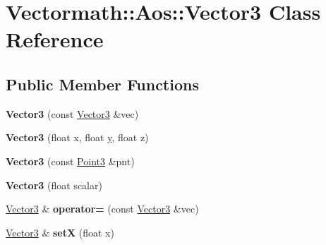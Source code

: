 \hypertarget{class_vectormath_1_1_aos_1_1_vector3}{\section{Vectormath\+:\+:Aos\+:\+:Vector3 Class Reference}
\label{class_vectormath_1_1_aos_1_1_vector3}
}
\subsection*{Public Member Functions}
\begin{DoxyCompactItemize}
\item 
\hypertarget{class_vectormath_1_1_aos_1_1_vector3_ac61c5909c53f4daf35a4950a94de9b1d}{{\bfseries Vector3} (const \hyperlink{class_vectormath_1_1_aos_1_1_vector3}{Vector3} \&vec)}\label{class_vectormath_1_1_aos_1_1_vector3_ac61c5909c53f4daf35a4950a94de9b1d}

\item 
\hypertarget{class_vectormath_1_1_aos_1_1_vector3_a0cded5830f3b42d3983f187fb2716f4f}{{\bfseries Vector3} (float x, float \hyperlink{_ice_utils_8h_aa7ffaed69623192258fb8679569ff9ba}{y}, float z)}\label{class_vectormath_1_1_aos_1_1_vector3_a0cded5830f3b42d3983f187fb2716f4f}

\item 
\hypertarget{class_vectormath_1_1_aos_1_1_vector3_a5c4725284242af1e99b5ab244c03ad2e}{{\bfseries Vector3} (const \hyperlink{class_vectormath_1_1_aos_1_1_point3}{Point3} \&pnt)}\label{class_vectormath_1_1_aos_1_1_vector3_a5c4725284242af1e99b5ab244c03ad2e}

\item 
\hypertarget{class_vectormath_1_1_aos_1_1_vector3_aa64785a6836fa840d949fecd6d419721}{{\bfseries Vector3} (float scalar)}\label{class_vectormath_1_1_aos_1_1_vector3_aa64785a6836fa840d949fecd6d419721}

\item 
\hypertarget{class_vectormath_1_1_aos_1_1_vector3_a01b5bd9dda1570098fed4ac8567710f2}{\hyperlink{class_vectormath_1_1_aos_1_1_vector3}{Vector3} \& {\bfseries operator=} (const \hyperlink{class_vectormath_1_1_aos_1_1_vector3}{Vector3} \&vec)}\label{class_vectormath_1_1_aos_1_1_vector3_a01b5bd9dda1570098fed4ac8567710f2}

\item 
\hypertarget{class_vectormath_1_1_aos_1_1_vector3_acd3df8665279eab78736f9b21ea26806}{\hyperlink{class_vectormath_1_1_aos_1_1_vector3}{Vector3} \& {\bfseries set\+X} (float x)}\label{class_vectormath_1_1_aos_1_1_vector3_acd3df8665279eab78736f9b21ea26806}


\end{DoxyCompactItemize}
